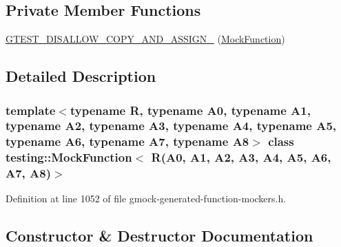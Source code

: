 \subsection*{Private Member Functions}
\begin{DoxyCompactItemize}
\item 
\hyperlink{classtesting_1_1MockFunction_3_01R_07A0_00_01A1_00_01A2_00_01A3_00_01A4_00_01A5_00_01A6_00_01A7_00_01A8_08_4_ab2fa9029953595acdbbfc95b7544cb92}{G\+T\+E\+S\+T\+\_\+\+D\+I\+S\+A\+L\+L\+O\+W\+\_\+\+C\+O\+P\+Y\+\_\+\+A\+N\+D\+\_\+\+A\+S\+S\+I\+G\+N\+\_\+} (\hyperlink{classtesting_1_1MockFunction}{Mock\+Function})
\end{DoxyCompactItemize}


\subsection{Detailed Description}
\subsubsection*{template$<$typename R, typename A0, typename A1, typename A2, typename A3, typename A4, typename A5, typename A6, typename A7, typename A8$>$\newline
class testing\+::\+Mock\+Function$<$ R(\+A0, A1, A2, A3, A4, A5, A6, A7, A8)$>$}



Definition at line 1052 of file gmock-\/generated-\/function-\/mockers.\+h.



\subsection{Constructor \& Destructor Documentation}
\mbox{\label{classtesting_1_1MockFunction_3_01R_07A0_00_01A1_00_01A2_00_01A3_00_01A4_00_01A5_00_01A6_00_01A7_00_01A8_08_4_a67f9fca4cf71a5811add15da604a6bbf}} 
